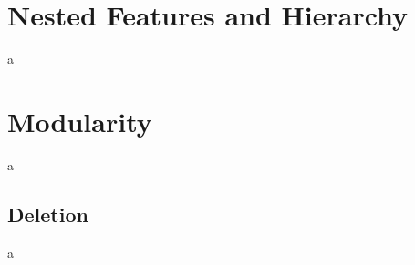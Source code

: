\section{Nested Features and
Hierarchy}\label{nested-features-and-hierarchy}

a

\section{Modularity}\label{modularity}

a

\subsection{Deletion}\label{deletion}

a
